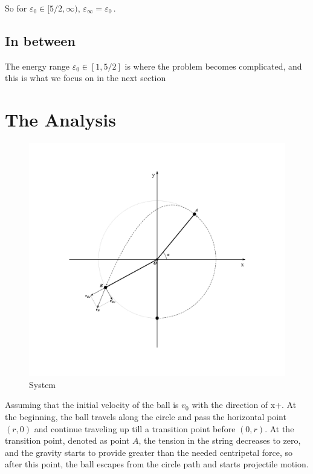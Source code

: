 \documentclass[]{article}
\begin{document}
So for $\varepsilon_0 \in [5/2, \infty)$, $\varepsilon_\infty = \varepsilon_0$\,.

\subsection{In between}
The energy range $\varepsilon_0 \in [1, 5/2]$ is where the problem becomes complicated, and this is what we focus on in the next section

\section{The Analysis}

\begin{figure}[!h]
	\centering
	\includegraphics[scale=0.4]{system.pdf}
	\caption{System}
	\label{fig:sys}
\end{figure}

Assuming that the initial velocity of the ball is $v_0$ with the direction of x+. At the beginning, the ball travels along the circle and pass the horizontal point $(r, 0)$ and continue traveling up till a transition point before $(0, r)$. At the transition point, denoted as point $A$, the tension in the string decreases to zero, and the gravity starts to provide greater than the needed centripetal force, so after this point, the ball escapes from the circle path and starts projectile motion.
\end{document}
